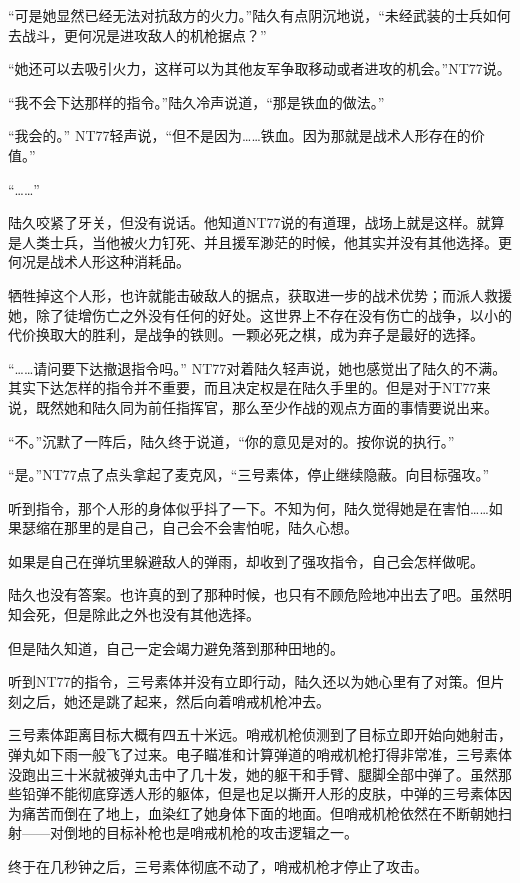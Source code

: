 “可是她显然已经无法对抗敌方的火力。”陆久有点阴沉地说，“未经武装的士兵如何去战斗，更何况是进攻敌人的机枪据点？”

“她还可以去吸引火力，这样可以为其他友军争取移动或者进攻的机会。”NT77说。

“我不会下达那样的指令。”陆久冷声说道，“那是铁血的做法。”

“我会的。” NT77轻声说，“但不是因为……铁血。因为那就是战术人形存在的价值。”

“……”

陆久咬紧了牙关，但没有说话。他知道NT77说的有道理，战场上就是这样。就算是人类士兵，当他被火力钉死、并且援军渺茫的时候，他其实并没有其他选择。更何况是战术人形这种消耗品。

牺牲掉这个人形，也许就能击破敌人的据点，获取进一步的战术优势；而派人救援她，除了徒增伤亡之外没有任何的好处。这世界上不存在没有伤亡的战争，以小的代价换取大的胜利，是战争的铁则。一颗必死之棋，成为弃子是最好的选择。

“……请问要下达撤退指令吗。” NT77对着陆久轻声说，她也感觉出了陆久的不满。其实下达怎样的指令并不重要，而且决定权是在陆久手里的。但是对于NT77来说，既然她和陆久同为前任指挥官，那么至少作战的观点方面的事情要说出来。

“不。”沉默了一阵后，陆久终于说道，“你的意见是对的。按你说的执行。”

“是。”NT77点了点头拿起了麦克风，“三号素体，停止继续隐蔽。向目标强攻。”

听到指令，那个人形的身体似乎抖了一下。不知为何，陆久觉得她是在害怕……如果瑟缩在那里的是自己，自己会不会害怕呢，陆久心想。

如果是自己在弹坑里躲避敌人的弹雨，却收到了强攻指令，自己会怎样做呢。

陆久也没有答案。也许真的到了那种时候，也只有不顾危险地冲出去了吧。虽然明知会死，但是除此之外也没有其他选择。

但是陆久知道，自己一定会竭力避免落到那种田地的。

听到NT77的指令，三号素体并没有立即行动，陆久还以为她心里有了对策。但片刻之后，她还是跳了起来，然后向着哨戒机枪冲去。

三号素体距离目标大概有四五十米远。哨戒机枪侦测到了目标立即开始向她射击，弹丸如下雨一般飞了过来。电子瞄准和计算弹道的哨戒机枪打得非常准，三号素体没跑出三十米就被弹丸击中了几十发，她的躯干和手臂、腿脚全部中弹了。虽然那些铅弹不能彻底穿透人形的躯体，但是也足以撕开人形的皮肤，中弹的三号素体因为痛苦而倒在了地上，血染红了她身体下面的地面。但哨戒机枪依然在不断朝她扫射——对倒地的目标补枪也是哨戒机枪的攻击逻辑之一。

终于在几秒钟之后，三号素体彻底不动了，哨戒机枪才停止了攻击。

